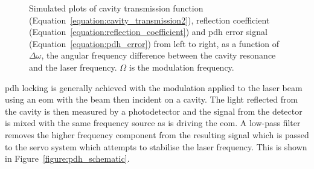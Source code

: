 \begin{figure}
\centering

\caption[Simulated cavity transmission and reflection, and \gls{pdh} error spectra.]{Simulated plots of cavity transmission function (Equation~\ref{equation:cavity_transmission2}), reflection coefficient (Equation~\ref{equation:reflection_coefficient}) and \gls{pdh} error signal (Equation~\ref{equation:pdh_error}) from left to right, as a function of $\Delta\omega$, the angular frequency difference between the cavity resonance and the laser frequency. $\Omega$ is the modulation frequency.}
\label{figure:pdh_plots}
\end{figure}

\Gls{pdh} locking is generally achieved with the modulation applied to the laser beam using an \gls{eom} with the beam then incident on a cavity.
The light reflected from the cavity is then measured by a photodetector and the signal from the detector is mixed with the same frequency source as is driving the \gls{eom}.
A low-pass filter removes the higher frequency component from the resulting signal which is passed to the servo system which attempts to stabilise the laser frequency.
This is shown in Figure~\ref{figure:pdh_schematic}.
